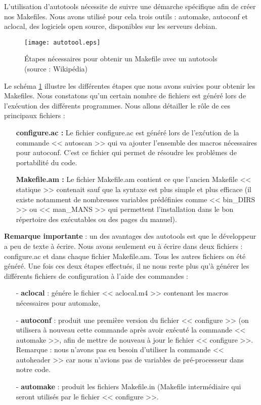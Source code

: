 L'utilisation d'autotools n\'ecessite de suivre une d\'emarche sp\'ecifique afin de cr\'eer nos Makefiles. Nous avons utilis\'e pour
cela trois outils : automake\citep{automake}, autoconf\citep{tuto_autotool} et aclocal, des logiciels open source, disponibles sur les serveurs debian.
\begin{figure}[h]
 \centerline{\texttt{[image: autotool.eps]}}
\caption{\'Etapes n\'ecessaires pour obtenir un Makefile avec un autotools (source : Wikip\'edia)} \label{fig:autotool}
\end{figure}
Le sch\'ema \ref{fig:autotool} illustre les diff\'erentes \'etapes que nous avons suivies pour obtenir les Makefiles.
Nous constatons qu'un certain nombre de fichiers est g\'en\'er\'e lors de l'ex\'ecution des diff\'erents programmes.
Nous allons d\'etailler le r\^ole de ces principaux fichiers :
\newline
\begin{itemize}
 \item [\textbullet] \textbf{ configure.ac :} Le fichier configure.ac est g\'en\'er\'e lors de l'ex\'cution de la commande << autoscan >>
qui va ajouter l'ensemble des macros n\'ecessaires pour autoconf. C'est ce fichier qui permet de r\'esoudre les probl\^emes de portabilit\'e du code.
\newline
 \item [\textbullet] \textbf{ Makefile.am :} Le fichier Makefile.am contient ce que l'ancien Makefile << statique >> contenait sauf que la syntaxe est 
plus simple et plus efficace (il existe notamment de nombreuses variables pr\'ed\'efinies comme << bin\_DIRS >> ou << man\_MANS >> qui permettent l'installation
dans le bon r\'epertoire des ex\'ecutables ou des pages du manuel).  
\newline

\end{itemize}
\textbf{Remarque importante} : un des avantages des autotools est que le d\'eveloppeur a peu de texte \`a \'ecrire. Nous avons seulement eu \`a \'ecrire dans
deux fichiers : configure.ac et dans chaque fichier Makefile.am. Tous les autres fichiers on \'et\'e g\'en\'er\'e.
\newline
\newline
Une fois ces deux \'etapes effectu\'es, il ne nous reste plus qu'\`a g\'en\'erer les diff\'erents fichiers de configuration \`a l'aide des commandes :
\begin{itemize}
 \item [-] \textbf{aclocal} : g\'en\'ere le fichier << aclocal.m4 >> contenant les macros n\'ecessaires pour automake,
 \item [-] \textbf{autoconf} : produit une premi\`ere version du fichier << configure >> (on utilisera \`a nouveau cette commande apr\`es avoir ex\'ecut\'e 
la commande << automake >>, afin de mettre de nouveau \`a jour le fichier << configure >>.
Remarque : nous n'avons pas eu besoin  d'utiliser la commande << autoheader >> car nous n'avions pas de variables de pr\'e-processeur dans notre code.
 \item [-] \textbf{automake} : produit les fichiers Makefile.in (Makefile interm\'ediaire qui seront utilis\'es par le fichier << configure >>.
\newline
\end{itemize}
